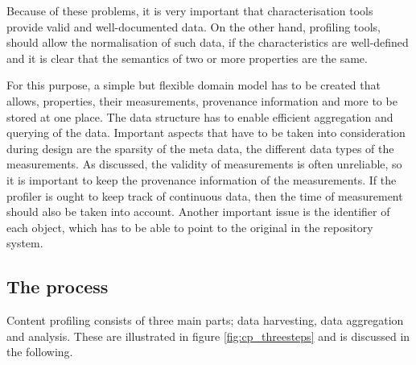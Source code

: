 Because of these problems, it is very important that characterisation tools provide valid and well-documented data. On the other hand, profiling tools, should allow the normalisation of such data, if the characteristics are well-defined and it is clear that the semantics of two or more properties are the same.

For this purpose, a simple but flexible domain model has to be created that allows, properties, their measurements, provenance information and more to be stored at one place. The data structure has to enable efficient aggregation and querying of the data. Important aspects that have to be taken into consideration during design are the sparsity of the meta data, the different data types of the measurements. As discussed, the validity of measurements is often unreliable, so it is important to keep the provenance information of the measurements. If the profiler is ought to keep track of continuous data, then the time of measurement should also be taken into account. Another important issue is the identifier of each object, which has to be able to point to the original in the repository system.


\subsection{The process}
Content profiling consists of three main parts; data harvesting, data aggregation and analysis. These are illustrated in figure \ref{fig:cp_threesteps} and is discussed in the following.

